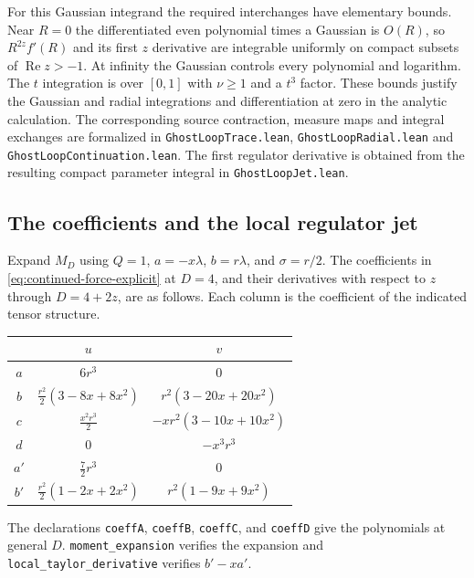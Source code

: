 \documentclass[11pt]{article}
\newcommand{\code}[1]{{\small\nolinkurl{#1}}}
\begin{document}
For this Gaussian integrand the required interchanges have elementary
bounds. Near $R=0$ the differentiated even polynomial times a Gaussian
is $O(R)$, so $R^{2z}f'(R)$ and its first $z$ derivative are integrable
uniformly on compact subsets of $\operatorname{Re}z>-1$.
At infinity the Gaussian controls every polynomial and logarithm.
The $t$ integration is over $[0,1]$ with $\nu\ge1$ and a $t^3$
factor. These bounds justify the Gaussian and radial integrations
and differentiation at zero in the analytic calculation.
The corresponding source contraction, measure maps and integral
exchanges are formalized in \code{GhostLoopTrace.lean},
\code{GhostLoopRadial.lean} and \code{GhostLoopContinuation.lean}.
The first regulator derivative is obtained from the resulting compact
parameter integral in \code{GhostLoopJet.lean}.

\subsection{The coefficients and the local regulator jet}

Expand $M_D$ using $Q=1$, $a=-x\lambda$, $b=r\lambda$,
and $\sigma=r/2$. The coefficients in
\eqref{eq:continued-force-explicit} at $D=4$, and their derivatives
with respect to $z$ through $D=4+2z$, are as follows. Each column
is the coefficient of the indicated tensor structure.
\begin{center}
\begin{tabular}{c|c|c}
 & $u$ & $v$\\ \hline
$a$ & $6r^3$ & $0$\\
$b$ & $\frac{r^2}{2}(3-8x+8x^2)$ & $r^2(3-20x+20x^2)$\\
$c$ & $\frac{x^2r^3}{2}$ & $-xr^2(3-10x+10x^2)$\\
$d$ & $0$ & $-x^3r^3$\\
$a'$ & $\frac72r^3$ & $0$\\
$b'$ & $\frac{r^2}{2}(1-2x+2x^2)$ & $r^2(1-9x+9x^2)$
\end{tabular}
\end{center}
The declarations \code{coeffA}, \code{coeffB}, \code{coeffC}, and
\code{coeffD} give the polynomials at general $D$.
\code{moment_expansion} verifies the expansion and
\code{local_taylor_derivative} verifies $b'-xa'$.
\end{document}
